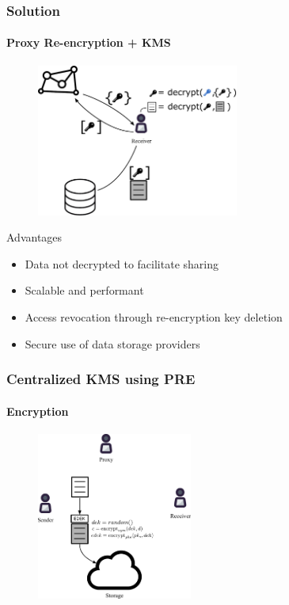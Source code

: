 \documentclass[xetex,mathsans,sans]{beamer}
\begin{document}
    \begin{frame}
        \frametitle{Solution}
        \framesubtitle{Proxy Re-encryption + KMS}
        \begin{figure}
            \centering
            \includegraphics[height=5cm]{pdf/pre-kms.pdf}
        \end{figure}

        Advantages
        \begin{itemize}
            \item Data not decrypted to facilitate sharing
            \item Scalable and performant
            \item Access revocation through re-encryption key deletion
            \item Secure use of data storage providers
        \end{itemize}
    \end{frame}

    \begin{frame}
        \frametitle{Centralized KMS using PRE}
        \framesubtitle{Encryption}
        \begin{figure}
            \centering
            \includegraphics[height=5.5cm]{pdf/encrypt.pdf}
        \end{figure}
    \end{frame}
\end{document}
